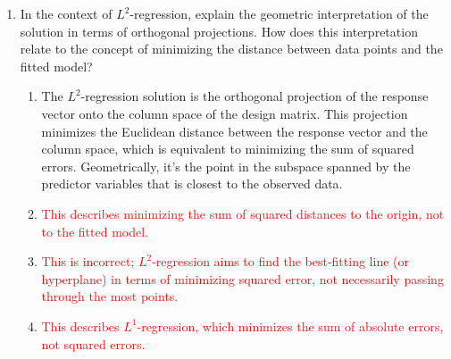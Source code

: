\documentclass{article}%
\newcommand{\incorrect}[1]{\textcolor{red}{#1}}
\begin{document}
\begin{enumerate}
\begin{enumerate}%
\item \incorrect{Answer A is incorrect. The solution is not necessarily the closest point to the origin; it's the projection onto the subspace defined by the predictor variables.}%
\item \incorrect{Answer B is incorrect.  Minimizing the sum of distances is not the same as minimizing the sum of squared distances.  $L^2$-regression minimizes the sum of squared distances.}%
\item Answer C is correct.  The $L^2$-regression solution can be interpreted geometrically as the orthogonal projection of the response vector onto the column space of the design matrix. This projection minimizes the Euclidean distance between the data points and the fitted model.%
\item \incorrect{Answer D is incorrect. The solution minimizes, not maximizes, the distance between the data points and the fitted model.}%
\item \incorrect{Answer E is incorrect. The geometric interpretation provides valuable insight into the nature of the $L^2$-regression solution.}%
\end{enumerate}%
\vspace{1em}%
\item In the context of $L^2$-regression, explain the geometric interpretation of the solution in terms of orthogonal projections. How does this interpretation relate to the concept of minimizing the distance between data points and the fitted model?%
\begin{enumerate}%
\item The $L^2$-regression solution is the orthogonal projection of the response vector onto the column space of the design matrix.  This projection minimizes the Euclidean distance between the response vector and the column space, which is equivalent to minimizing the sum of squared errors.  Geometrically, it's the point in the subspace spanned by the predictor variables that is closest to the observed data.%
\item \incorrect{This describes minimizing the sum of squared distances to the origin, not to the fitted model.}%
\item \incorrect{This is incorrect; $L^2$-regression aims to find the best-fitting line (or hyperplane) in terms of minimizing squared error, not necessarily passing through the most points.}%
\item \incorrect{This describes $L^1$-regression, which minimizes the sum of absolute errors, not squared errors.}%

\end{enumerate}
\end{enumerate}
\end{document}
